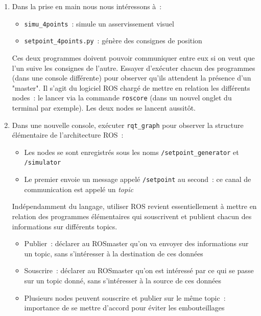\documentclass[12pt,a4paper]{article}
\begin{document}
\begin{enumerate}
On voit qu'en plus de \texttt{simu\_4points}, ROS nous propose d'exécuter \texttt{arm\_bridge.py}, \linebreak\texttt{dh\_code.py}, \texttt{init\_tp.py}  et \texttt{setpoint\_4points.py}. Il s'agit de fichiers Python qui n'ont pas besoin d'être compilés pour être lancés\footnote{ Pour être détecté par \texttt{rosrun} un fichier Python doit être exécutable}.
On reconnaît le fichier \texttt{init\_tp.py} qui a été lancé pour initialiser l'environnement.
\item Dans la prise en main nous nous intéressons à~:
\begin{itemize}
\item  \texttt{simu\_4points}~: simule un asservissement visuel
\item \texttt{setpoint\_4points.py}~: génère des consignes de position
\end{itemize}
Ces deux programmes doivent pouvoir communiquer entre eux si on veut que l'un suive les consignes de l'autre. Essayer d'exécuter chacun des programmes (dans une console différente) pour observer qu'ils attendent la présence d'un "master". Il s'agit du logiciel ROS chargé de mettre en relation les différents nodes~: le lancer via la commande \texttt{roscore} (dans un nouvel onglet du terminal par exemple). Les deux nodes se lancent aussitôt.
\item Dans une nouvelle console, exécuter \texttt{rqt\_graph}  pour observer la structure élémentaire de l'architecture ROS~:
\begin{itemize}
\item Les nodes se sont enregistrés sous les noms \texttt{/setpoint\_generator} et \texttt{/simulator} 
\item Le premier envoie un message appelé \texttt{/setpoint} au second~: ce canal de communication est appelé un \emph{topic}
\end{itemize}
Indépendamment du langage, utiliser ROS revient essentiellement à mettre en relation des programmes élémentaires qui souscrivent et publient chacun des informations sur différents topics.
\begin{itemize}
\item Publier~: déclarer au ROSmaster qu'on va envoyer des informations sur un topic, sans s'intéresser à la destination de ces données
\item Souscrire~: déclarer au ROSmaster qu'on est intéressé par ce qui se passe sur un topic donné, sans s'intéresser à la source de ces données
\item Plusieurs nodes peuvent souscrire et publier sur le même topic~: importance de se mettre d'accord pour éviter les embouteillages

\end{itemize}
\end{enumerate}
\end{document}
